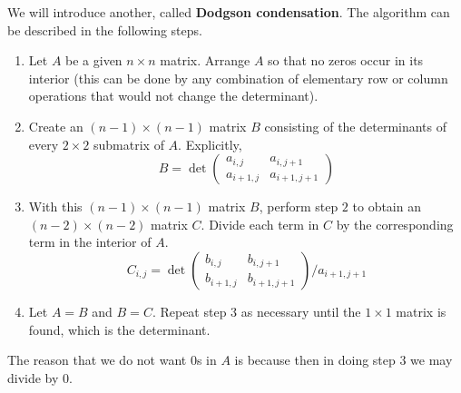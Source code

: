   \begin{algo}
    We will introduce another, called \textbf{Dodgson condensation}. The algorithm can be described in the following steps.

    \begin{enumerate}
      \item Let $A$ be a given $n \times n$ matrix. Arrange $A$ so that no zeros occur in its interior (this can be done by any combination of elementary row or column operations that would not change the determinant). 
      \item Create an $(n-1) \times (n-1)$ matrix $B$ consisting of the determinants of every $2 \times 2$ submatrix of $A$. Explicitly, 
      \begin{equation}
        B = \det{\begin{pmatrix} a_{i,j} & a_{i,j+1} \\ a_{i+1,j} & a_{i+1,j+1} \end{pmatrix}}
      \end{equation}
      \item With this $(n-1) \times (n-1)$ matrix $B$, perform step $2$ to obtain an $(n-2) \times (n-2)$ matrix $C$. Divide each term in $C$ by the corresponding term in the interior of $A$. 
      \begin{equation}
        C_{i,j} = \det{\begin{pmatrix} b_{i,j} & b_{i,j+1} \\ b_{i+1,j} & b_{i+1,j+1} \end{pmatrix}} \bigg/ a_{i+1,j+1}
      \end{equation}
      \item Let $A = B$ and $B=C$. Repeat step $3$ as necessary until the $1 \times 1$ matrix is found, which is the determinant. 
    \end{enumerate}

    The reason that we do not want $0$s in $A$ is because then in doing step $3$ we may divide by $0$. 
  \end{algo}

